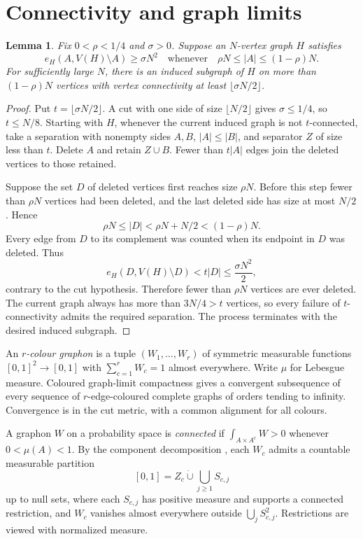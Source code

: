 \documentclass[11pt]{article}
\newtheorem{lemma}[theorem]{Lemma}
\begin{document}
\section{Connectivity and graph limits}

\begin{lemma}\label{lem:core}
Fix $0<\rho<1/4$ and $\sigma>0$. Suppose an $N$-vertex graph $H$ satisfies
\[
 e_H(A,V(H)\setminus A)\geq\sigma N^2
 \quad\text{whenever}\quad
 \rho N\leq|A|\leq(1-\rho)N.
\]
For sufficiently large $N$, there is an induced subgraph of $H$ on more than
$(1-\rho)N$ vertices with vertex connectivity at least
$\lfloor\sigma N/2\rfloor$.
\end{lemma}
\begin{proof}
Put $t=\lfloor\sigma N/2\rfloor$. A cut with one side of size
$\lfloor N/2\rfloor$ gives $\sigma\leq1/4$, so $t\leq N/8$.
Starting with $H$, whenever the current induced graph is not $t$-connected,
take a separation with nonempty sides $A,B$, $|A|\leq|B|$, and separator
$Z$ of size less than $t$. Delete $A$ and retain $Z\cup B$. Fewer than
$t|A|$ edges join the deleted vertices to those retained.

Suppose the set $D$ of deleted vertices first reaches size $\rho N$.
Before this step fewer than $\rho N$ vertices had been deleted, and the
last deleted side has size at most $N/2$. Hence
\[
 \rho N\leq|D|<\rho N+N/2<(1-\rho)N.
\]
Every edge from $D$ to its complement was counted when its endpoint in $D$
was deleted. Thus
\[
 e_H(D,V(H)\setminus D)<t|D|\leq\frac{\sigma N^2}{2},
\]
contrary to the cut hypothesis. Therefore fewer than $\rho N$ vertices are
ever deleted. The current graph always has more than $3N/4>t$ vertices,
so every failure of $t$-connectivity admits the required separation. The
process terminates with the desired induced subgraph.
\end{proof}

An \emph{$r$-colour graphon} is a tuple $(W_1,\ldots,W_r)$ of symmetric
measurable functions $[0,1]^2\to[0,1]$ with $\sum_{c=1}^r W_c=1$ almost everywhere.
Write $\mu$ for Lebesgue measure. Coloured graph-limit compactness
\cite{decorated} gives a convergent subsequence of every sequence of
$r$-edge-coloured complete graphs of orders tending to infinity. Convergence
is in the cut metric, with a common alignment for all colours.

A graphon $W$ on a probability space is \emph{connected} if
$\int_{A\times A^{\mathrm c}}W>0$ whenever $0<\mu(A)<1$. By the component decomposition
\cite[Lemma 5.5]{janson}, each $W_c$ admits a countable measurable partition
\begin{equation}\label{eq:components}
 [0,1]=Z_c\mathbin{\dot\cup}\bigcup_{j\geq1}S_{c,j}
\end{equation}
up to null sets, where each $S_{c,j}$ has positive measure and supports a
connected restriction, and $W_c$ vanishes almost everywhere outside
$\bigcup_j S_{c,j}^2$. Restrictions are viewed with normalized measure.
\end{document}
